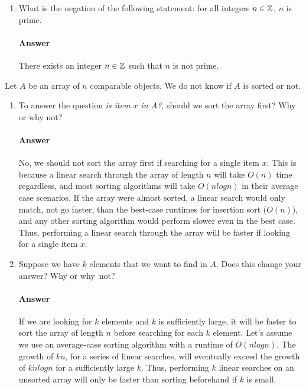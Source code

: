\documentclass{article}
\begin{document}
\begin{enumerate}
\begin{proof}
	$\frac{k(k-1)}{2} + k$
	$= \frac{k(k-1)}{2} + \frac{2k}{2}$
	$ = \frac{k(k-1) + 2k}{2}$
	$ = \frac{k^2 - k +2k}{2} $
	$ = \frac{k^2 + k}{2}$
	$ = \frac{k(k+1)}{2}$
	
	The claim that for all $n \in \N$, the complete graph on $n$ vertices has $\frac{n(n-1)}{2}$~edges, which was to be shown.
        \end{proof}

    \item What is the negation of the following statement: for all integers $n
        \in {\mathbb Z}$, $n$ is prime.

        \paragraph{Answer}{There exists an integer $n \in {\mathbb Z}$ such that $n$ is not prime.}

\end{enumerate}


Let $A$ be an array of $n$ comparable objects.  We do not know if $A$ is sorted
or not.

\begin{enumerate}
    \item To answer the question \emph{is item $x$ in $A$?}, should we
        sort the array first?  Why or why not?

        \paragraph{Answer}{No, we should not sort the array first if searching for a single item $x$. This is because a linear search through the array of length $n$ will take $O(n)$ time regardless, and most sorting algorithms will take $O(nlogn)$ in their average case scenarios. If the array were almost sorted, a linear search would only match, not go faster, than the best-case runtimes for insertion sort ($O(n)$), and any other sorting algorithm would perform slower even in the best case. Thus, performing a linear search through the array will be faster if looking for a single item $x$.}

    \item Suppose we have $k$ elements that we want to find in $A$. Does this
        change your answer? Why or why~not?

        \paragraph{Answer}{If we are looking for $k$ elements and $k$ is sufficiently large, it will be faster to sort the array of length $n$ before searching for each $k$ element. Let's assume we use an average-case sorting algorithm with a runtime of $O(nlogn)$. The growth of $k \dot n$, for a series of linear searches, will eventually exceed the growth of $k \dot nlogn$ for a sufficiently large $k$. Thus, performing $k$ linear searches on an unsorted array will only be faster than sorting beforehand if $k$ is small.}

\end{enumerate}
\end{document}
